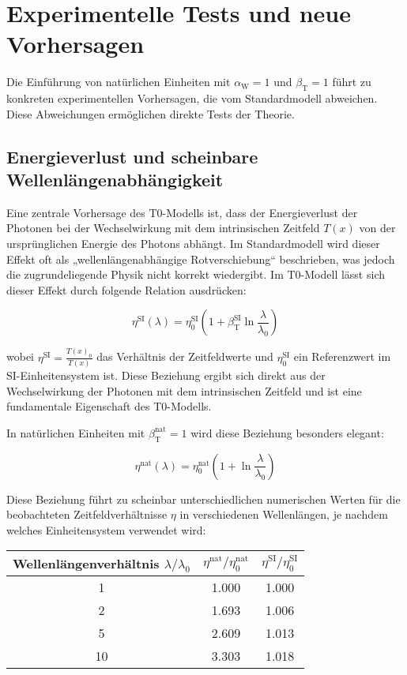 \documentclass[12pt,a4paper]{article}
\newcommand{\Tfield}{T(x)}
\newcommand{\betaT}{\beta_{\text{T}}}
\newcommand{\alphaW}{\alpha_{\text{W}}}
\begin{document}
	\section{Experimentelle Tests und neue Vorhersagen}
	
	Die Einführung von natürlichen Einheiten mit \(\alphaW = 1\) und \(\betaT = 1\) führt zu konkreten experimentellen Vorhersagen, die vom Standardmodell abweichen. Diese Abweichungen ermöglichen direkte Tests der Theorie.
	
	\subsection{Energieverlust und scheinbare Wellenlängenabhängigkeit}
	
	Eine zentrale Vorhersage des T0-Modells ist, dass der Energieverlust der Photonen bei der Wechselwirkung mit dem intrinsischen Zeitfeld \(\Tfield\) von der ursprünglichen Energie des Photons abhängt. Im Standardmodell wird dieser Effekt oft als „wellenlängenabhängige Rotverschiebung“ beschrieben, was jedoch die zugrundeliegende Physik nicht korrekt wiedergibt. Im T0-Modell lässt sich dieser Effekt durch folgende Relation ausdrücken:
	
	\begin{equation}
		\eta^{\text{SI}}(\lambda) = \eta_0^{\text{SI}} \left(1 + \betaT^{\text{SI}} \ln \frac{\lambda}{\lambda_0}\right)
	\end{equation}
	
	wobei \(\eta^{\text{SI}} = \frac{\Tfield_0}{\Tfield}\) das Verhältnis der Zeitfeldwerte und \(\eta_0^{\text{SI}}\) ein Referenzwert im SI-Einheitensystem ist. Diese Beziehung ergibt sich direkt aus der Wechselwirkung der Photonen mit dem intrinsischen Zeitfeld und ist eine fundamentale Eigenschaft des T0-Modells.
	
	In natürlichen Einheiten mit \(\betaT^{\text{nat}} = 1\) wird diese Beziehung besonders elegant:
	
	\begin{equation}
		\eta^{\text{nat}}(\lambda) = \eta_0^{\text{nat}} \left(1 + \ln \frac{\lambda}{\lambda_0}\right)
	\end{equation}
	
	Diese Beziehung führt zu scheinbar unterschiedlichen numerischen Werten für die beobachteten Zeitfeldverhältnisse \(\eta\) in verschiedenen Wellenlängen, je nachdem welches Einheitensystem verwendet wird:
	
	\begin{center}
		\begin{tabular}{|c|c|c|}
			\hline
			\textbf{Wellenlängenverhältnis \(\lambda/\lambda_0\)} & \textbf{\(\eta^{\text{nat}}/\eta_0^{\text{nat}}\)} & \textbf{\(\eta^{\text{SI}}/\eta_0^{\text{SI}}\)} \\
			\hline
			1 & 1.000 & 1.000 \\
			2 & 1.693 & 1.006 \\
			5 & 2.609 & 1.013 \\
			10 & 3.303 & 1.018 \\
			\hline
		\end{tabular}
	\end{center}
	
\end{document}
